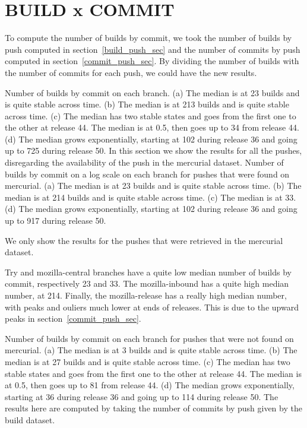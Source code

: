 \section{BUILD x COMMIT}

To compute the number of builds by commit, we took the number of builds by push computed in section~\ref{build_push_sec} and the number of commits by push computed in section~\ref{commit_push_sec}. By dividing the number of builds with the number of commits for each push, we could have the new results.


{
    Number of builds by commit on each branch. (a) The median is at 23 builds and is quite stable across time. (b) The median is at 213 builds and is quite stable across time.  (c) The median has two stable states and goes from the first one to the other at release 44. The median is at 0.5, then goes up to 34 from release 44. (d) The median grows exponentially, starting at 102 during release 36 and going up to 725 during release 50.
}
{
    In this section we show the results for all the pushes, disregarding the availability of the push in the mercurial dataset. 
}
{
    Number of builds by commit on a log scale on each branch for pushes that were found on mercurial. (a) The median is at 23 builds and is quite stable across time. (b) The median is at 214 builds and is quite stable across time.  (c) The median is at 33. (d) The median grows exponentially, starting at 102 during release 36 and going up to 917 during release 50.
}
{
    We only show the results for the pushes that were retrieved in the mercurial dataset.
    
    Try and mozilla-central branches have a quite low median number of builds by commit, respectively 23 and 33. The mozilla-inbound has a quite high median number, at 214. Finally, the mozilla-release has a really high median number, with peaks and ouliers much lower at ends of releases. This is due to the upward peaks in section~\ref{commit_push_sec}.
    
}
{
    Number of builds by commit on each branch for pushes that were not found on mercurial. (a) The median is at 3 builds and is quite stable across time. (b) The median is at 27 builds and is quite stable across time.  (c) The median has two stable states and goes from the first one to the other at release 44. The median is at 0.5, then goes up to 81 from release 44. (d) The median grows exponentially, starting at 36 during release 36 and going up to 114 during release 50.
}
{
    The results here are computed by taking the number of commits by push given by the build dataset.
}